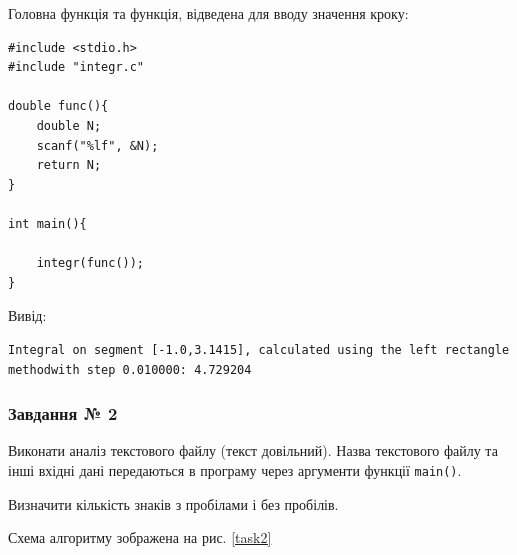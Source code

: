 \documentclass[12pt]{extreport}
\begin{document}
Головна функція та функція, відведена для вводу значення кроку:
\begin{lstlisting}[frame=single]
#include <stdio.h>
#include "integr.c"

double func(){
	double N;
	scanf("%lf", &N);
	return N;
}

int main(){

	integr(func());
}

\end{lstlisting}

Вивід:

\begin{lstlisting}
Integral on segment [-1.0,3.1415], calculated using the left rectangle methodwith step 0.010000: 4.729204
\end{lstlisting}

\subsubsection*{Завдання № 2}
Виконати аналіз текстового файлу (текст довільний). Назва текстового файлу
та інші вхідні дані передаються в програму через аргументи функції \texttt{main()}.

Визначити кількість знаків з пробілами і без пробілів.

\bigskip
Схема алгоритму зображена на рис. \ref{task2}
\end{document}
